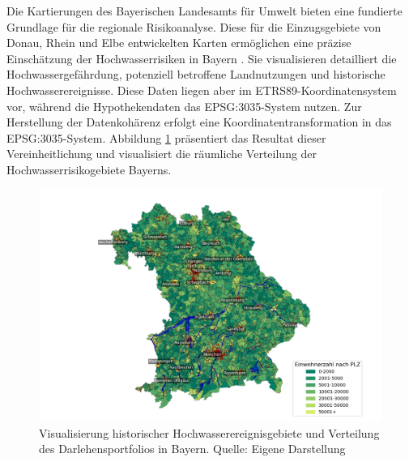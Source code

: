 Die Kartierungen des Bayerischen Landesamts für Umwelt bieten eine fundierte Grundlage für die regionale Risikoanalyse. Diese für die Einzugsgebiete von Donau, Rhein und Elbe entwickelten Karten ermöglichen eine präzise Einschätzung der Hochwasserrisiken in Bayern \parencite{LfU_Bayern}. Sie visualisieren detailliert die Hochwassergefährdung, potenziell betroffene Landnutzungen und historische Hochwasserereignisse.
Diese Daten liegen aber im ETRS89-Koordinatensystem vor, während die Hypothekendaten das EPSG:3035-System nutzen. Zur Herstellung der Datenkohärenz erfolgt eine Koordinatentransformation in das EPSG:3035-System. Abbildung \ref{fig:bayernflut} präsentiert das Resultat dieser Vereinheitlichung und visualisiert die räumliche Verteilung der Hochwasserrisikogebiete Bayerns.
\begin{figure}[htbp]
    \centering
    \includegraphics[width=\textwidth]{figures/bayern_flut.png} 
    \caption{Visualisierung historischer Hochwasserereignisgebiete und Verteilung des Darlehensportfolios in Bayern. Quelle: Eigene Darstellung}
    \label{fig:bayernflut}
\end{figure}
\FloatBarrier



